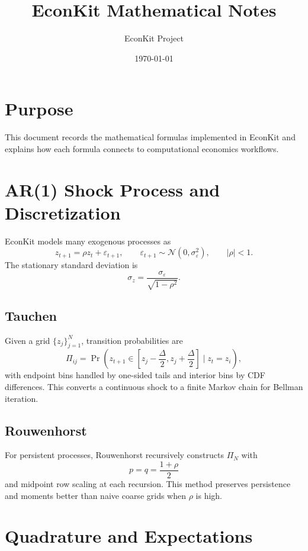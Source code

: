 \documentclass[11pt]{article}
\title{EconKit Mathematical Notes}
\author{EconKit Project}
\date{\today}
\begin{document}
\maketitle

\section{Purpose}
This document records the mathematical formulas implemented in EconKit and explains
how each formula connects to computational economics workflows.

\section{AR(1) Shock Process and Discretization}
EconKit models many exogenous processes as
\begin{equation}
    z_{t+1} = \rho z_t + \varepsilon_{t+1}, \qquad \varepsilon_{t+1} \sim \mathcal{N}(0, \sigma_\varepsilon^2), \qquad |\rho| < 1.
\end{equation}
The stationary standard deviation is
\begin{equation}
    \sigma_z = \frac{\sigma_\varepsilon}{\sqrt{1-\rho^2}}.
\end{equation}

\subsection{Tauchen}
Given a grid \(\{z_j\}_{j=1}^N\), transition probabilities are
\begin{equation}
    \Pi_{ij} = \Pr\left(z_{t+1} \in \left[z_j-\frac{\Delta}{2}, z_j+\frac{\Delta}{2}\right] \mid z_t=z_i\right),
\end{equation}
with endpoint bins handled by one-sided tails and interior bins by CDF differences.
This converts a continuous shock to a finite Markov chain for Bellman iteration.

\subsection{Rouwenhorst}
For persistent processes, Rouwenhorst recursively constructs \(\Pi_N\) with
\begin{equation}
    p = q = \frac{1+\rho}{2}
\end{equation}
and midpoint row scaling at each recursion. This method preserves persistence
and moments better than naive coarse grids when \(\rho\) is high.

\section{Quadrature and Expectations}
\end{document}
